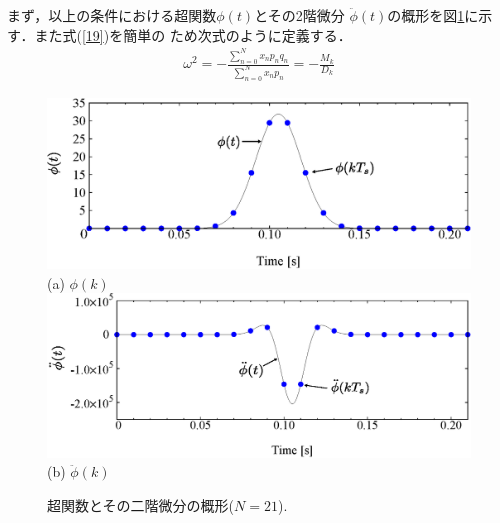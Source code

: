 \documentclass[a4paper,12pt]{jarticle}
\begin{document}
まず，以上の条件における超関数$\phi(t)$とその2階微分
$\ddot{\phi}(t)$の概形を図\ref{ddphi}に示す．また式(\ref{19})を簡単の
ため次式のように定義する．
\begin{align}
\omega^2=-\frac{\sum^{N}_{n=0}x_np_nq_n}{\sum^{N}_{n=0}x_np_n}=-\frac{M_k}{D_k}
\end{align}

\begin{figure}[t]
 \begin{center}
  \includegraphics[width=0.8\linewidth]{phi.eps}\\
  (a) $\phi(k)$\\
\vspace{1.5cm}
\hspace{-17mm}
  \includegraphics[width=0.9\linewidth]{ddphi.eps}\\
  (b) $\ddot{\phi}(k)$
 \end{center}
 \caption{超関数とその二階微分の概形($N=21$).}
 \label{ddphi}
\end{figure}


\end{document}
